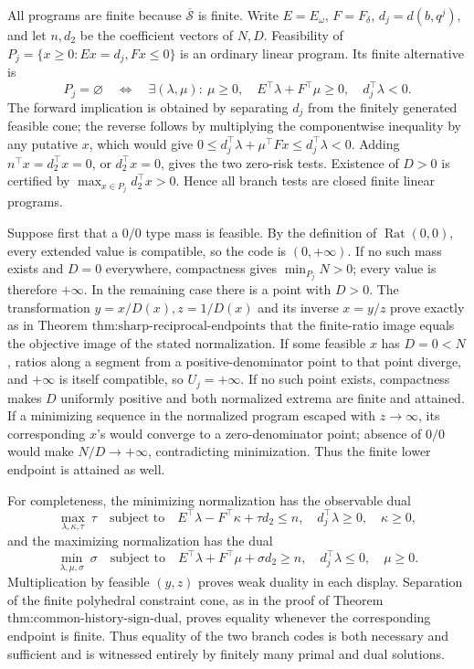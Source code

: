 All programs are finite because \(\overline{\mathcal S}\) is finite.  Write \(E=E_\omega\), \(F=F_\delta\), \(d_j=d(b,q^j)\), and let \(n,d_2\) be the coefficient vectors of \(N,D\).  Feasibility of \(P_j=\{x\geq0:Ex=d_j,Fx\leq0\}\) is an ordinary linear program.  Its finite alternative is
\[
P_j=\varnothing
\quad\Longleftrightarrow\quad
\exists(\lambda,\mu):\ \mu\geq0,\quad E^\top\lambda+F^\top\mu\geq0,
\quad d_j^\top\lambda<0.
\]
The forward implication is obtained by separating \(d_j\) from the finitely generated feasible cone; the reverse follows by multiplying the componentwise inequality by any putative \(x\), which would give \(0\leq d_j^\top\lambda+\mu^\top Fx\leq d_j^\top\lambda<0\).  Adding \(n^\top x=d_2^\top x=0\), or \(d_2^\top x=0\), gives the two zero-risk tests.  Existence of \(D>0\) is certified by \(\max_{x\in P_j}d_2^\top x>0\).  Hence all branch tests are closed finite linear programs.

Suppose first that a \(0/0\) type mass is feasible.  By the definition of \(\operatorname{Rat}(0,0)\), every extended value is compatible, so the code is \((0,+\infty)\).  If no such mass exists and \(D=0\) everywhere, compactness gives \(\min_{P_j}N>0\); every value is therefore \(+\infty\).  In the remaining case there is a point with \(D>0\).  The transformation \(y=x/D(x),z=1/D(x)\) and its inverse \(x=y/z\) prove exactly as in Theorem \(\text{thm:sharp-reciprocal-endpoints}\) that the finite-ratio image equals the objective image of the stated normalization.  If some feasible \(x\) has \(D=0<N\), ratios along a segment from a positive-denominator point to that point diverge, and \(+\infty\) is itself compatible, so \(U_j=+\infty\).  If no such point exists, compactness makes \(D\) uniformly positive and both normalized extrema are finite and attained.  If a minimizing sequence in the normalized program escaped with \(z\to\infty\), its corresponding \(x\)'s would converge to a zero-denominator point; absence of \(0/0\) would make \(N/D\to+\infty\), contradicting minimization.  Thus the finite lower endpoint is attained as well.

For completeness, the minimizing normalization has the observable dual
\[
\max_{\lambda,\kappa,\tau}\ \tau
\quad\text{subject to}\quad
E^\top\lambda-F^\top\kappa+\tau d_2\leq n,
\quad d_j^\top\lambda\geq0,\quad\kappa\geq0,
\]
and the maximizing normalization has the dual
\[
\min_{\lambda,\mu,\sigma}\ \sigma
\quad\text{subject to}\quad
E^\top\lambda+F^\top\mu+\sigma d_2\geq n,
\quad d_j^\top\lambda\leq0,\quad\mu\geq0.
\]
Multiplication by feasible \((y,z)\) proves weak duality in each display.  Separation of the finite polyhedral constraint cone, as in the proof of Theorem \(\text{thm:common-history-sign-dual}\), proves equality whenever the corresponding endpoint is finite.  Thus equality of the two branch codes is both necessary and sufficient and is witnessed entirely by finitely many primal and dual solutions.

